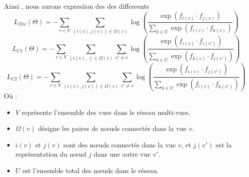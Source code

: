 \begin{enumerate}
               Ainsi , nous aurons expresiion des des differeents 
                 \begin{equation}
                    L_{Div}(\Theta) =-\sum_{v \in V} \sum_{(i(v), j(v)) \in \Omega(v)} \log \left( \frac{\exp(f_{i(v)} \cdot f_{j(v)})}{\sum_{k \in U} \exp(f_{i(v)} \cdot f_{k(v)})} \right)
                \end{equation}
                 \begin{equation}
                    L_{C1}(\Theta)= -\sum_{v \in V} \sum_{(i(v), \cdot) \in \Omega(v)} \sum_{v' \neq v} \log \left( \frac{\exp(f_{i(v)} \cdot f_{i(v')})}{\sum_{k \in U} \exp(f_{k(v)} \cdot f_{i(v')})} \right)
                \end{equation}
                \begin{equation}
                  L_{C2}(\Theta)  = -\sum_{v \in V} \sum_{(i(v), j(v)) \in \Omega(v)} \sum_{v' \neq v} \log \left( \frac{\exp(f_{i(v)} \cdot f_{j(v')})}{\sum_{k \in U} \exp(f_{i(v)} \cdot f_{k(v')})} \right)
                \end{equation}
                Où :
                \begin{itemize}
                    \item \( V \) représente l'ensemble des vues dans le réseau multi-vues.
                    \item \( \Omega(v) \) désigne les paires de nœuds connectés dans la vue \( v \).
                    \item \( i(v) \) et \( j(v) \) sont des nœuds connectés dans la vue \( v \), et \( j(v') \) est la représentation du nœud \( j \) dans une autre vue \( v' \).
                    \item \( U \) est l'ensemble total des nœuds dans le réseau.
                   
                  
                \end{itemize}

        \end{enumerate}












